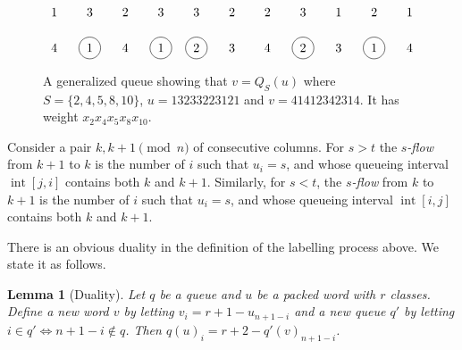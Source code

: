 \documentclass[reqno]{amsart}
\newcommand{\0}{\phantom{c}}
\DeclareMathOperator{\inter}{int} %
\newcommand{\defn}[1]{{\color{darkred}\emph{#1}}} %
\theoremstyle{plain}
\newtheorem{lemma}[thm]{Lemma}
\theoremstyle{definition}
\newtheorem{remark}[thm]{Remark}
\numberwithin{equation}{section}
\begin{document}
\begin{figure}
\label{fi:queue_example}
\[
\begin{tikzpicture}
  \node at  (1,2){1};
  \node at  (2,2){3};
  \node at  (3,2){2};
  \node at  (4,2){3};
  \node at  (5,2){3};
  \node at  (6,2){2};
  \node at  (7,2){2};
  \node at  (8,2){3};
  \node at  (9,2){1};
  \node at (10,2){2};
  \node at (11,2){1};

  \node at                     (1,1){4};
  \node[circle,draw=black] at  (2,1){1};
  \node at                     (3,1){4};
  \node[circle,draw=black] at  (4,1){1};
  \node[circle,draw=black] at  (5,1){2};
  \node at                     (6,1){3};
  \node at                     (7,1){4};
  \node[circle,draw=black] at  (8,1){2};
  \node at                     (9,1){3};
  \node[circle,draw=black] at (10,1){1};
  \node at                    (11,1){4};
\end{tikzpicture}
\]
\caption{A generalized queue showing that $v = Q_S(u)$ where $S = \{2,4,5,8,10\}$, $u = 13233223121$ and $v =41412342314$. It has weight $x_2x_4x_5x_8x_{10}$.}
\end{figure}


Consider a pair $k, k+1 \pmod{n}$ of consecutive columns.
For $s > t$ the \defn{$s$-flow} from $k+1$ to $k$ is the number of $i$ such that $u_i=s$, and whose queueing interval $\inter[j,i]$ contains both $k$ and $k+1$.
Similarly, for $s < t$, the \defn{$s$-flow} from $k$ to $k+1$ is the number of $i$ such that $u_i = s$, and whose queueing interval $\inter[i,j]$ contains both $k$ and $k+1$.

There is an obvious duality in the definition of the labelling process above. We state it as follows.

\begin{lemma}[Duality]
  \label{le:dual}
  Let $q$ be a queue and $u$ be a packed word with $r$ classes. Define a new word $v$ by letting $v_i = r + 1 - u_{n+1-i}$ and a new queue $q'$ by letting $i \in q' \Leftrightarrow n+1-i \notin q$.
 Then $q(u)_i = r + 2 - q'(v)_{n+1-i}$.
\end{lemma}

\end{document}
